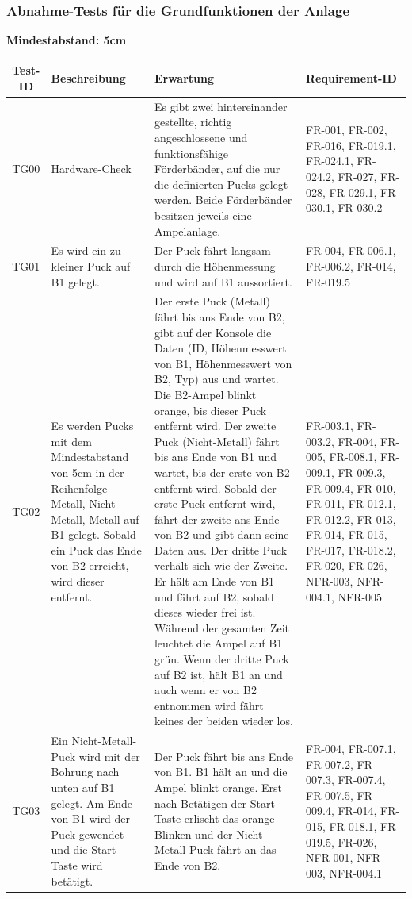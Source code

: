 \documentclass[oneside,a4paper,titlepage]{scrartcl}              %
\begin{document}
\subsubsection{Abnahme-Tests für die Grundfunktionen der Anlage}
\textbf{Mindestabstand: 5cm}
\begin{small}
  \begin{center}
    \begin{longtable}{|c|p{4cm}|p{6cm}|C{3cm}|}
      \hline
      \textbf{Test-ID} & \textbf{Beschreibung} & \textbf{Erwartung} & \textbf{Requirement-ID}\\
      \toprule
      \endhead
      \hline
      TG00 & Hardware-Check & Es gibt zwei hintereinander gestellte, richtig angeschlossene
      und funktionsfähige Förderbänder, auf die nur die definierten Pucks gelegt werden.
      Beide Förderbänder besitzen jeweils eine Ampelanlage. & FR-001, FR-002, FR-016, FR-019.1, FR-024.1, FR-024.2, FR-027, FR-028, FR-029.1, FR-030.1, FR-030.2\\
      \hline
       TG01 & Es wird ein zu kleiner Puck auf B1 gelegt. & Der Puck fährt langsam durch die Höhenmessung und wird auf B1 aussortiert. & FR-004, FR-006.1, FR-006.2, FR-014, FR-019.5\\
      \hline
      TG02 & Es werden Pucks mit dem Mindestabstand von 5cm in der Reihenfolge Metall, Nicht-Metall, Metall auf B1 gelegt. Sobald ein Puck das Ende von B2 erreicht, wird dieser entfernt. & Der erste Puck (Metall) fährt bis ans Ende von B2, gibt auf der Konsole die Daten (ID, Höhenmesswert von B1, Höhenmesswert von B2, Typ) aus und wartet.
      Die B2-Ampel blinkt orange, bis dieser Puck entfernt wird.
      Der zweite Puck (Nicht-Metall) fährt bis ans Ende von B1 und wartet, bis der erste von B2 entfernt wird.
      Sobald der erste Puck entfernt wird, fährt der zweite ans Ende von B2 und gibt dann seine Daten aus.
      Der dritte Puck verhält sich wie der Zweite. Er hält am Ende von B1 und fährt auf B2, sobald dieses wieder frei ist. Während der gesamten Zeit leuchtet die Ampel auf B1 grün.
      Wenn der dritte Puck auf B2 ist, hält B1 an und auch wenn er von B2 entnommen wird fährt keines der beiden wieder los. & FR-003.1, FR-003.2, FR-004, FR-005, FR-008.1, FR-009.1, FR-009.3, FR-009.4, FR-010, FR-011, FR-012.1, FR-012.2, FR-013, FR-014, FR-015, FR-017, FR-018.2, FR-020, FR-026, NFR-003, NFR-004.1, NFR-005\\
      \hline
       TG03 & Ein Nicht-Metall-Puck wird mit der Bohrung nach unten auf B1 gelegt. Am Ende von B1 wird der Puck gewendet und die Start-Taste wird betätigt. & Der Puck fährt bis ans Ende von B1. B1 hält an und die Ampel blinkt orange. Erst nach Betätigen der Start-Taste erlischt das orange Blinken und der Nicht-Metall-Puck fährt an das Ende von B2. & FR-004, FR-007.1, FR-007.2, FR-007.3, FR-007.4, FR-007.5, FR-009.4, FR-014, FR-015, FR-018.1, FR-019.5, FR-026, NFR-001, NFR-003, NFR-004.1\\

\end{longtable}
\end{center}
\end{small}
\end{document}
